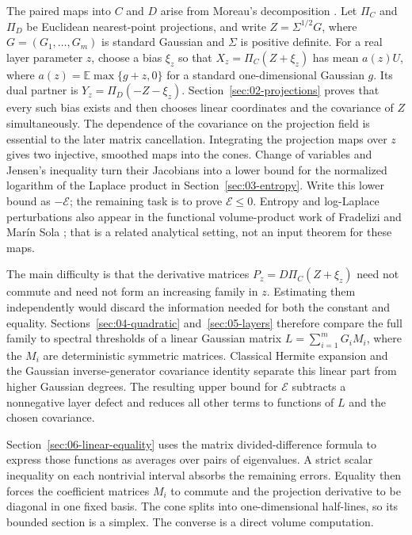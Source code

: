 The paired maps into $C$ and $D$ arise from Moreau's decomposition
\cite{Moreau1962,Soltan2019}. Let $\Pi_C$ and $\Pi_D$ be Euclidean nearest-point projections, and
write $Z=\Sigma^{1/2}G$, where $G=(G_1,\ldots,G_m)$ is standard Gaussian
and $\Sigma$ is positive definite. For a real layer parameter $z$,
choose a bias $\xi_z$ so that
$X_z=\Pi_C(Z+\xi_z)$ has mean $a(z)U$, where
$a(z)=\mathbb E\max\{g+z,0\}$ for a standard one-dimensional Gaussian $g$.
Its dual partner is $Y_z=\Pi_D(-Z-\xi_z)$.
Section~\ref{sec:02-projections} proves that every such bias exists and
then chooses linear coordinates and the covariance of $Z$
simultaneously. The dependence of the covariance on the projection
field is essential to the later matrix cancellation. Integrating the
projection maps over $z$ gives two injective, smoothed maps into the
cones. Change of variables and Jensen's inequality turn their Jacobians
into a lower bound for the normalized logarithm of the Laplace product
in Section~\ref{sec:03-entropy}. Write this lower bound as
$-\mathcal E$; the remaining task is to prove $\mathcal E\le0$.
Entropy and log-Laplace perturbations also appear in the functional
volume-product work of Fradelizi and Mar\'in Sola
\cite{FradeliziMarinSola2024}; that is a related analytical setting,
not an input theorem for these maps.

The main difficulty is that the derivative matrices $P_z=D\Pi_C(Z+\xi_z)$
need not commute and need not form an increasing family in $z$.
Estimating them independently would discard the information needed for
both the constant and equality. Sections~\ref{sec:04-quadratic}
and~\ref{sec:05-layers} therefore compare the full family to spectral
thresholds of a linear Gaussian matrix $L=\sum_{i=1}^mG_iM_i$, where the
$M_i$ are deterministic symmetric matrices. Classical Hermite expansion
and the Gaussian inverse-generator covariance identity
\cite[Proposition~2.1]{HoudrePrivault2002} separate this
linear part from higher Gaussian degrees. The resulting upper bound
for $\mathcal E$ subtracts a nonnegative layer defect and reduces
all other terms to functions of $L$ and the chosen covariance.

Section~\ref{sec:06-linear-equality} uses the matrix divided-difference
formula to express those functions as averages over pairs of eigenvalues.
A strict scalar inequality on each nontrivial interval absorbs the
remaining errors. Equality then forces the coefficient matrices $M_i$
to commute and the projection derivative to be diagonal in one fixed
basis. The cone splits into one-dimensional half-lines, so its bounded
section is a simplex. The converse is a direct volume computation.

